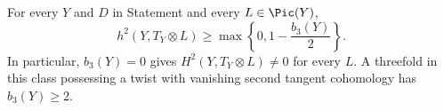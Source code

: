 \begin{proposition}\hypertarget{tag-01BP}{}\label{cdp:st:C.1.3}


For every $Y$ and $D$ in Statement  and every $L\in\Pic(Y)$,
\[
 h^2(Y,T_Y\otimes L)\geq
 \max\left\{0,1-\frac{b_3(Y)}2\right\}.
\]
In particular, $b_3(Y)=0$ gives $H^2(Y,T_Y\otimes L)\ne0$ for
every $L$. A threefold in this class possessing a twist with vanishing
second tangent cohomology has $b_3(Y)\geq2$.
\end{proposition}
